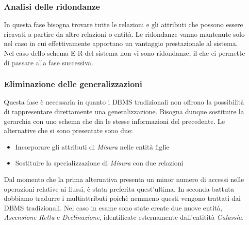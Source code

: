 \documentclass[12pt,a4paper,onecolumn,x11names]{article}
\begin{document}
	\subsubsection{Analisi delle ridondanze}
		\begin{flushleft}
			In questa fase bisogna trovare tutte le relazioni e gli attributi che possono essere ricavati a partire da altre relazioni o entità. Le ridondanze vanno mantenute solo nel caso in cui effettivamente apportano un vantaggio prestazionale al sistema.		
			Nel caso dello schema E-R del sistema non vi sono ridondanze, il che ci permette di passare alla fase successiva.
		\end{flushleft}
	\subsubsection{Eliminazione delle generalizzazioni}
		\begin{flushleft}
			Questa fase è necessaria in quanto i DBMS tradizionali non offrono la possibilità di rappresentare direttamente una generalizzazione. Bisogna dunque sostituire la gerarchia con uno schema che dia le stesse informazioni del precedente.
			Le alternative che si sono presentate sono due:
			\begin{itemize}
				\item Incorporare gli attributi di \textit{Misura} nelle entità figlie
				\item Sostituire la specializzazione di \textit{Misura} con due relazioni
			\end{itemize}
			Dal momento che la prima alternativa presenta un minor numero di accessi nelle operazioni relative ai flussi, è stata preferita quest'ultima.
			In seconda battuta dobbiamo tradurre i multiattributi poichè nemmeno questi vengono trattati dai DBMS tradizionali. Nel caso in esame sono state create due nuove entità, \textit{Ascensione Retta} e \textit{Declinazione}, identificate esternamente dall'entitità \textit{Galassia}.
		\end{flushleft}
\end{document}
